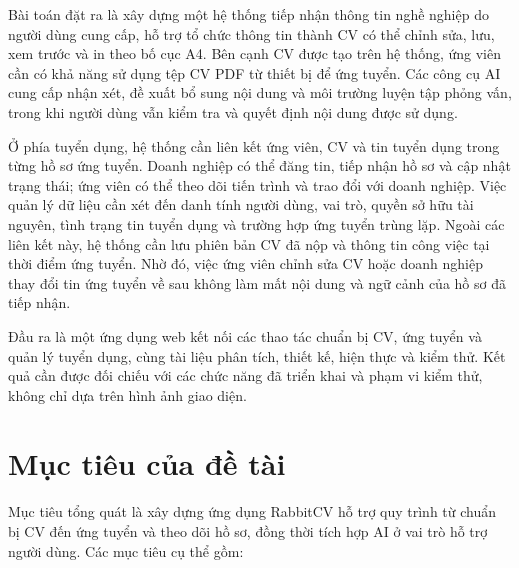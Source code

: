 Bài toán đặt ra là xây dựng một hệ thống tiếp nhận thông tin nghề nghiệp do người dùng cung cấp, hỗ trợ tổ chức thông tin thành CV có thể chỉnh sửa, lưu, xem trước và in theo bố cục A4. Bên cạnh CV được tạo trên hệ thống, ứng viên cần có khả năng sử dụng tệp CV PDF từ thiết bị để ứng tuyển. Các công cụ AI cung cấp nhận xét, đề xuất bổ sung nội dung và môi trường luyện tập phỏng vấn, trong khi người dùng vẫn kiểm tra và quyết định nội dung được sử dụng.

Ở phía tuyển dụng, hệ thống cần liên kết ứng viên, CV và tin tuyển dụng trong từng hồ sơ ứng tuyển. Doanh nghiệp có thể đăng tin, tiếp nhận hồ sơ và cập nhật trạng thái; ứng viên có thể theo dõi tiến trình và trao đổi với doanh nghiệp. Việc quản lý dữ liệu cần xét đến danh tính người dùng, vai trò, quyền sở hữu tài nguyên, tình trạng tin tuyển dụng và trường hợp ứng tuyển trùng lặp. Ngoài các liên kết này, hệ thống cần lưu phiên bản CV đã nộp và thông tin công việc tại thời điểm ứng tuyển. Nhờ đó, việc ứng viên chỉnh sửa CV hoặc doanh nghiệp thay đổi tin ứng tuyển về sau không làm mất nội dung và ngữ cảnh của hồ sơ đã tiếp nhận.

Đầu ra là một ứng dụng web kết nối các thao tác chuẩn bị CV, ứng tuyển và quản lý tuyển dụng, cùng tài liệu phân tích, thiết kế, hiện thực và kiểm thử. Kết quả cần được đối chiếu với các chức năng đã triển khai và phạm vi kiểm thử, không chỉ dựa trên hình ảnh giao diện.

\section{Mục tiêu của đề tài}

Mục tiêu tổng quát là xây dựng ứng dụng RabbitCV hỗ trợ quy trình từ chuẩn bị CV đến ứng tuyển và theo dõi hồ sơ, đồng thời tích hợp AI ở vai trò hỗ trợ người dùng. Các mục tiêu cụ thể gồm:


